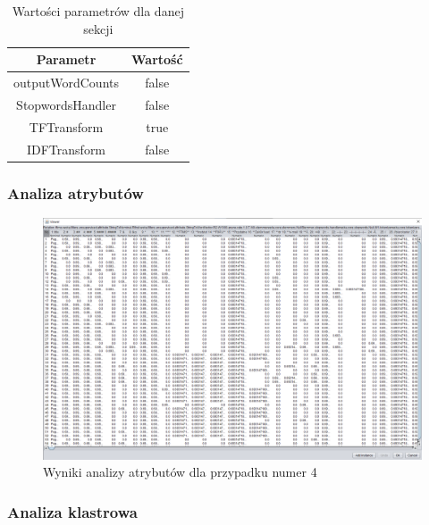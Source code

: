 \documentclass[../EDI_Task2_Karwowski_Kowalewski.tex]{subfiles}
\begin{document}
{{        \begin{table}[!htbp]
            \small
            \centering
            \begin{tabular}{|c|c|}
                \hline
                Parametr & Wartość \\ \hline
                outputWordCounts & false \\ \hline
                StopwordsHandler & false \\ \hline
                TFTransform & true \\ \hline
                IDFTransform & false \\ \hline
            \end{tabular}
            \caption{Wartości parametrów dla danej sekcji}
        \end{table}
        \FloatBarrier

        \subsubsection{Analiza atrybutów} {

            \begin{figure}[!htbp]
                \centering
                \includegraphics[width=\textwidth]{img/results1/ftims-case4.png}
                \caption{Wyniki analizy atrybutów dla przypadku numer 4}
            \end{figure}
            \FloatBarrier
        }

        \subsubsection{Analiza klastrowa} {

}}}
\end{document}
